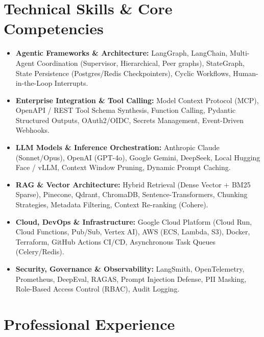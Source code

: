 \documentclass[a4paper,10pt]{article}
\begin{document}
\section{Technical Skills \& Core Competencies}
\begin{itemize}[leftmargin=1.2em, itemsep=2pt]
  \item \textbf{Agentic Frameworks \& Architecture:} LangGraph, LangChain, Multi-Agent Coordination (Supervisor, Hierarchical, Peer graphs), StateGraph, State Persistence (Postgres/Redis Checkpointers), Cyclic Workflows, Human-in-the-Loop Interrupts.
  \item \textbf{Enterprise Integration \& Tool Calling:} Model Context Protocol (MCP), OpenAPI / REST Tool Schema Synthesis, Function Calling, Pydantic Structured Outputs, OAuth2/OIDC, Secrets Management, Event-Driven Webhooks.
  \item \textbf{LLM Models \& Inference Orchestration:} Anthropic Claude (Sonnet/Opus), OpenAI (GPT-4o), Google Gemini, DeepSeek, Local Hugging Face / vLLM, Context Window Pruning, Dynamic Prompt Caching.
  \item \textbf{RAG \& Vector Architecture:} Hybrid Retrieval (Dense Vector + BM25 Sparse), Pinecone, Qdrant, ChromaDB, Sentence-Transformers, Chunking Strategies, Metadata Filtering, Context Re-ranking (Cohere).
  \item \textbf{Cloud, DevOps \& Infrastructure:} Google Cloud Platform (Cloud Run, Cloud Functions, Pub/Sub, Vertex AI), AWS (ECS, Lambda, S3), Docker, Terraform, GitHub Actions CI/CD, Asynchronous Task Queues (Celery/Redis).
  \item \textbf{Security, Governance \& Observability:} LangSmith, OpenTelemetry, Prometheus, DeepEval, RAGAS, Prompt Injection Defense, PII Masking, Role-Based Access Control (RBAC), Audit Logging.
\end{itemize}

\section{Professional Experience}
\end{document}
